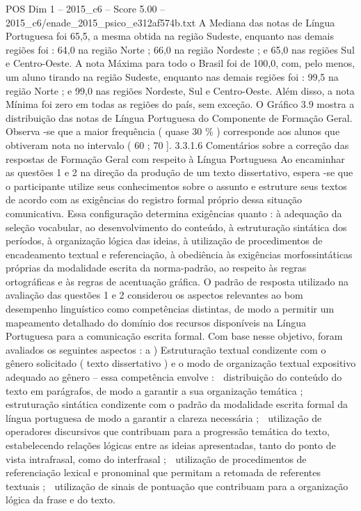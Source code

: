 \begin{textsample}{POS Dim 1 – 2015\_c6 – Score 5.00 – 2015\_c6/enade\_2015\_psico\_e312af574b.txt}
A Mediana das notas de Língua Portuguesa foi 65,5, a mesma obtida na região Sudeste, enquanto nas demais regiões foi : 64,0 na região Norte ; 66,0 na região Nordeste ; e 65,0 nas regiões Sul e Centro-Oeste.
A nota Máxima para todo o Brasil foi de 100,0, com, pelo menos, um aluno tirando na região Sudeste, enquanto nas demais regiões foi : 99,5 na região Norte ; e 99,0 nas regiões Nordeste, Sul e Centro-Oeste.
Além disso, a nota Mínima foi zero em todas as regiões do país, sem exceção.
O Gráfico 3.9 mostra a distribuição das notas de Língua Portuguesa do Componente de Formação Geral.
Observa -se que a maior frequência ( quase 30 \% ) corresponde aos alunos que obtiveram nota no intervalo ( 60 ; 70 ]. 3.3.1.6 Comentários sobre a correção das respostas de Formação Geral com respeito à Língua Portuguesa Ao encaminhar as questões 1 e 2 na direção da produção de um texto dissertativo, espera -se que o participante utilize seus conhecimentos sobre o assunto e estruture seus textos de acordo com as exigências do registro formal próprio dessa situação comunicativa.
Essa configuração determina exigências quanto : à adequação da seleção vocabular, ao desenvolvimento do conteúdo, à estruturação sintática dos períodos, à organização lógica das ideias, à utilização de procedimentos de encadeamento textual e referenciação, à obediência às exigências morfossintáticas próprias da modalidade escrita da norma-padrão, ao respeito às regras ortográficas e às regras de acentuação gráfica.
O padrão de resposta utilizado na avaliação das questões 1 e 2 considerou os aspectos relevantes ao bom desempenho linguístico como competências distintas, de modo a permitir um mapeamento detalhado do domínio dos recursos disponíveis na Língua Portuguesa para a comunicação escrita formal.
Com base nesse objetivo, foram avaliados os seguintes aspectos : a ) Estruturação textual condizente com o gênero solicitado ( texto dissertativo ) e o modo de organização textual expositivo adequado ao gênero – essa competência envolve :  distribuição do conteúdo do texto em parágrafos, de modo a garantir a sua organização temática ;  estruturação sintática condizente com o padrão da modalidade escrita formal da língua portuguesa de modo a garantir a clareza necessária ;  utilização de operadores discursivos que contribuam para a progressão temática do texto, estabelecendo relações lógicas entre as ideias apresentadas, tanto do ponto de vista intrafrasal, como do interfrasal ;  utilização de procedimentos de referenciação lexical e pronominal que permitam a retomada de referentes textuais ;  utilização de sinais de pontuação que contribuam para a organização lógica da frase e do texto.

\end{textsample}
